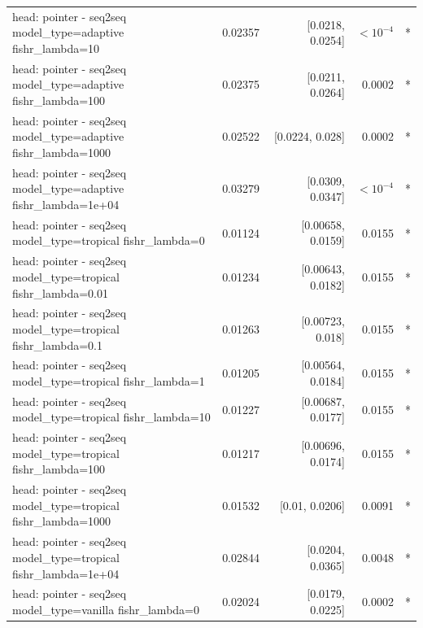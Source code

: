 \documentclass[10pt]{article}
\makeatletter
\newcommand{\stackcell}[1]{\begin{tabular}[t]{@{}l@{}}#1\end{tabular}}
\makeatother
\begin{document}
{\begin{longtable}{lrrrl}
\stackcell{head: pointer - seq2seq\\\footnotesize model\_type=adaptive fishr\_lambda=10 } & 0.02357 & [0.0218, 0.0254] & $<10^{-4}$ & *\\
\stackcell{head: pointer - seq2seq\\\footnotesize model\_type=adaptive fishr\_lambda=100 } & 0.02375 & [0.0211, 0.0264] & 0.0002 & *\\
\stackcell{head: pointer - seq2seq\\\footnotesize model\_type=adaptive fishr\_lambda=1000 } & 0.02522 & [0.0224, 0.028] & 0.0002 & *\\
\stackcell{head: pointer - seq2seq\\\footnotesize model\_type=adaptive fishr\_lambda=1e+04 } & 0.03279 & [0.0309, 0.0347] & $<10^{-4}$ & *\\
\stackcell{head: pointer - seq2seq\\\footnotesize model\_type=tropical fishr\_lambda=0 } & 0.01124 & [0.00658, 0.0159] & 0.0155 & *\\
\stackcell{head: pointer - seq2seq\\\footnotesize model\_type=tropical fishr\_lambda=0.01 } & 0.01234 & [0.00643, 0.0182] & 0.0155 & *\\
\stackcell{head: pointer - seq2seq\\\footnotesize model\_type=tropical fishr\_lambda=0.1 } & 0.01263 & [0.00723, 0.018] & 0.0155 & *\\
\stackcell{head: pointer - seq2seq\\\footnotesize model\_type=tropical fishr\_lambda=1 } & 0.01205 & [0.00564, 0.0184] & 0.0155 & *\\
\stackcell{head: pointer - seq2seq\\\footnotesize model\_type=tropical fishr\_lambda=10 } & 0.01227 & [0.00687, 0.0177] & 0.0155 & *\\
\stackcell{head: pointer - seq2seq\\\footnotesize model\_type=tropical fishr\_lambda=100 } & 0.01217 & [0.00696, 0.0174] & 0.0155 & *\\
\stackcell{head: pointer - seq2seq\\\footnotesize model\_type=tropical fishr\_lambda=1000 } & 0.01532 & [0.01, 0.0206] & 0.0091 & *\\
\stackcell{head: pointer - seq2seq\\\footnotesize model\_type=tropical fishr\_lambda=1e+04 } & 0.02844 & [0.0204, 0.0365] & 0.0048 & *\\
\stackcell{head: pointer - seq2seq\\\footnotesize model\_type=vanilla fishr\_lambda=0 } & 0.02024 & [0.0179, 0.0225] & 0.0002 & *\\

\end{longtable}}
\end{document}

